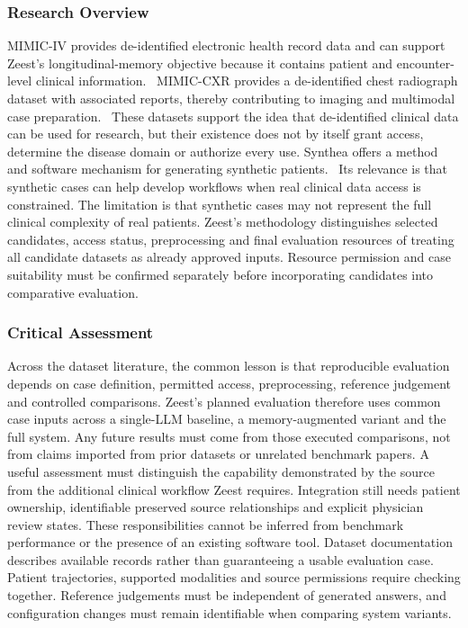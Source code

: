 \subsubsection{Research Overview}

MIMIC-IV provides de-identified electronic health record data and can support Zeest's longitudinal-memory objective because it contains patient and encounter-level clinical information.~\cite{zeestA:mimicIV} MIMIC-CXR provides a de-identified chest radiograph dataset with associated reports, thereby contributing to imaging and multimodal case preparation.~\cite{zeestB:mimiccxr} These datasets support the idea that de-identified clinical data can be used for research, but their existence does not by itself grant access, determine the disease domain or authorize every use. Synthea offers a method and software mechanism for generating synthetic patients.~\cite{zeestB:synthea} Its relevance is that synthetic cases can help develop workflows when real clinical data access is constrained. The limitation is that synthetic cases may not represent the full clinical complexity of real patients. Zeest's methodology distinguishes selected candidates, access status, preprocessing and final evaluation resources of treating all candidate datasets as already approved inputs. Resource permission and case suitability must be confirmed separately before incorporating candidates into comparative evaluation.

\subsubsection{Critical Assessment}

Across the dataset literature, the common lesson is that reproducible evaluation depends on case definition, permitted access, preprocessing, reference judgement and controlled comparisons. Zeest's planned evaluation therefore uses common case inputs across a single-LLM baseline, a memory-augmented variant and the full system. Any future results must come from those executed comparisons, not from claims imported from prior datasets or unrelated benchmark papers. A useful assessment must distinguish the capability demonstrated by the source from the additional clinical workflow Zeest requires. Integration still needs patient ownership, identifiable preserved source relationships and explicit physician review states. These responsibilities cannot be inferred from benchmark performance or the presence of an existing software tool. Dataset documentation describes available records rather than guaranteeing a usable evaluation case. Patient trajectories, supported modalities and source permissions require checking together. Reference judgements must be independent of generated answers, and configuration changes must remain identifiable when comparing system variants.

